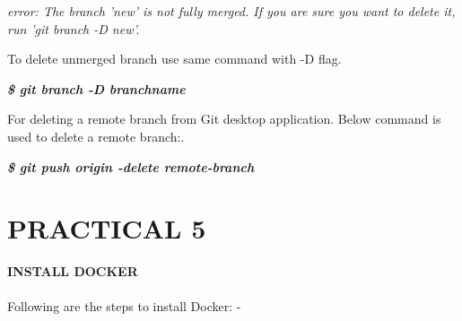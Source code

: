 \documentclass[12pt]{article}
\begin{document}
\vspace{1 mm}

\textit{error: The branch 'new' is not fully merged.
If you are sure you want to delete it, run 'git branch -D new'.}\\

\vspace{1 mm}

To delete unmerged branch use same command with -D flag.\\

\vspace{1mm}

\textit{\textbf{\$ git branch -D branchname}}\\

\vspace{1mm}

For deleting a remote branch from Git desktop application. Below command is used to delete a remote branch:.\\
\vspace{1 mm}

\textit{\textbf{\$ git push origin -delete remote-branch}}\\

\clearpage

\section{PRACTICAL 5}

\textbf{\uppercase {Install Docker}} \\
\vspace{0.1\baselineskip} \\

Following are the steps to install Docker: -
\end{document}
